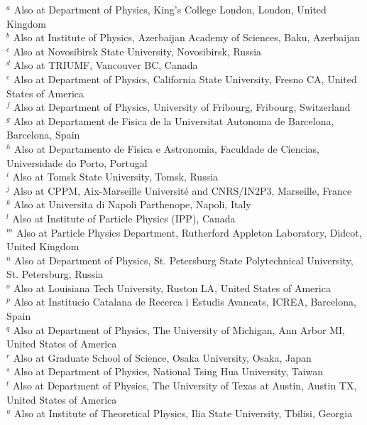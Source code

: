 \begin{flushleft}
$^{a}$ Also at Department of Physics, King's College London, London, United Kingdom\\
$^{b}$ Also at Institute of Physics, Azerbaijan Academy of Sciences, Baku, Azerbaijan\\
$^{c}$ Also at Novosibirsk State University, Novosibirsk, Russia\\
$^{d}$ Also at TRIUMF, Vancouver BC, Canada\\
$^{e}$ Also at Department of Physics, California State University, Fresno CA, United States of America\\
$^{f}$ Also at Department of Physics, University of Fribourg, Fribourg, Switzerland\\
$^{g}$ Also at Departament de Fisica de la Universitat Autonoma de Barcelona, Barcelona, Spain\\
$^{h}$ Also at Departamento de Fisica e Astronomia, Faculdade de Ciencias, Universidade do Porto, Portugal\\
$^{i}$ Also at Tomsk State University, Tomsk, Russia\\
$^{j}$ Also at CPPM, Aix-Marseille Universit{\'e} and CNRS/IN2P3, Marseille, France\\
$^{k}$ Also at Universita di Napoli Parthenope, Napoli, Italy\\
$^{l}$ Also at Institute of Particle Physics (IPP), Canada\\
$^{m}$ Also at Particle Physics Department, Rutherford Appleton Laboratory, Didcot, United Kingdom\\
$^{n}$ Also at Department of Physics, St. Petersburg State Polytechnical University, St. Petersburg, Russia\\
$^{o}$ Also at Louisiana Tech University, Ruston LA, United States of America\\
$^{p}$ Also at Institucio Catalana de Recerca i Estudis Avancats, ICREA, Barcelona, Spain\\
$^{q}$ Also at Department of Physics, The University of Michigan, Ann Arbor MI, United States of America\\
$^{r}$ Also at Graduate School of Science, Osaka University, Osaka, Japan\\
$^{s}$ Also at Department of Physics, National Tsing Hua University, Taiwan\\
$^{t}$ Also at Department of Physics, The University of Texas at Austin, Austin TX, United States of America\\
$^{u}$ Also at Institute of Theoretical Physics, Ilia State University, Tbilisi, Georgia\\

\end{flushleft}
